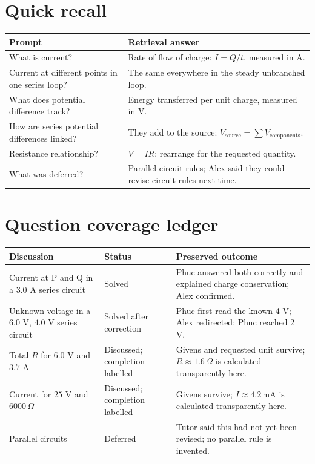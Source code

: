 \documentclass[11pt,a4paper]{article}
\begin{document}
\section{Quick recall}
\begin{tabular}{p{5.2cm}p{9.2cm}}
\toprule Prompt & Retrieval answer \\ \midrule
What is current? & Rate of flow of charge: $I=Q/t$, measured in A. \\
Current at different points in one series loop? & The same everywhere in the steady unbranched loop. \\
What does potential difference track? & Energy transferred per unit charge, measured in V. \\
How are series potential differences linked? & They add to the source: $V_{\text{source}}=\sum V_{\text{components}}$. \\
Resistance relationship? & $V=IR$; rearrange for the requested quantity. \\
What was deferred? & Parallel-circuit rules; Alex said they could revise circuit rules next time. \\ \bottomrule
\end{tabular}

\section{Question coverage ledger}
\begin{tabular}{p{5cm}p{2.3cm}p{7.1cm}}
\toprule Discussion & Status & Preserved outcome \\ \midrule
Current at P and Q in a $3.0$ A series circuit & Solved & Phuc answered both correctly and explained charge conservation; Alex confirmed. \\
Unknown voltage in a $6.0$ V, $4.0$ V series circuit & Solved after correction & Phuc first read the known 4 V; Alex redirected; Phuc reached 2 V. \\
Total $R$ for $6.0$ V and $3.7$ A & Discussed; completion labelled & Givens and requested unit survive; $R\approx1.6\,\Omega$ is calculated transparently here. \\
Current for $25$ V and $6000\,\Omega$ & Discussed; completion labelled & Givens survive; $I\approx4.2\,\mathrm{mA}$ is calculated transparently here. \\
Parallel circuits & Deferred & Tutor said this had not yet been revised; no parallel rule is invented. \\ \bottomrule
\end{tabular}
\end{document}
